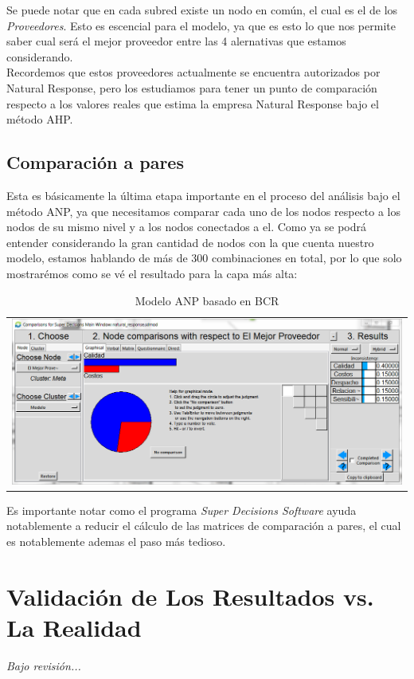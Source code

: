 \documentclass[12pt,letterpaper]{article}
\begin{document}
Se puede notar que en cada subred existe un nodo en común, el cual es el de los \textit{Proveedores}. Esto es escencial para el modelo, ya que es esto lo que nos permite saber cual será el mejor proveedor entre las 4 alernativas que estamos considerando.\\
Recordemos que estos proveedores actualmente se encuentra autorizados por Natural Response, pero los estudiamos para tener un punto de comparación respecto a los valores reales que estima la empresa Natural Response bajo el método AHP.
\newpage
\subsection{Comparación a pares}
Esta es básicamente la última etapa importante en el proceso del análisis bajo el método ANP, ya que necesitamos comparar cada uno de los nodos respecto a los nodos de su mismo nivel y a los nodos conectados a el. Como ya se podrá entender considerando la gran cantidad de nodos con la que cuenta nuestro modelo, estamos hablando de más de 300 combinaciones en total, por lo que solo mostrarémos como se vé el resultado para la capa más alta:

\begin{table}[h]
\centering
\begin{tabular}{c}
\includegraphics[width=\textwidth]{img/3.PNG}
\end{tabular}
\caption{Modelo ANP basado en BCR}
\label{tab:modelo capa 1}
\end{table}

Es importante notar como el programa \textit{Super Decisions Software} ayuda notablemente a reducir el cálculo de las matrices de comparación a pares, el cual es notablemente ademas el paso más tedioso.
\newpage
\section{Validación de Los Resultados vs. La Realidad}
\textit{Bajo revisión...}
\end{document}

